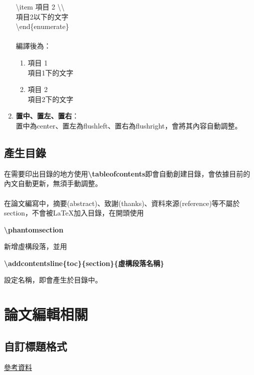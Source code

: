 \documentclass[12pt]{article}
\begin{document}
\begin{CJK*}{UTF8}{bsmi}
\begin{enumerate}[1.]
					\hspace*{5pc}\textbackslash item 項目 2 \textbackslash \textbackslash \\
					\hspace*{7pc} 項目2以下的文字 \\
					\hspace*{3pc}\textbackslash end\{enumerate\} \\ \\
					編譯後為：
					\begin{enumerate}[1.]
						\item 項目 1 \\
						項目1下的文字
						\item 項目 2 \\
						項目2下的文字
					\end{enumerate}
				\item \textbf{置中、置左、置右}： \\
					置中為center、置左為flushleft、置右為flushright，會將其內容自動調整。
			\end{enumerate}
		
		\newpage
		\subsection{產生目錄}
			\hspace*{2pc}在需要印出目錄的地方使用\textbf{\textbackslash tableofcontents}即會自動創建目錄，會依據目前的內文自動更新，無須手動調整。 \\ \\
			\hspace*{2pc}在論文編寫中，摘要(abstract)、致謝(thanks)、資料來源(reference)等不屬於section，不會被LaTeX加入目錄，在開頭使用
			\begin{center}
				\textbf{\textbackslash phantomsection}
			\end{center}
			新增虛構段落，並用
			\begin{center}
				\textbf{\textbackslash addcontentsline\{toc\}\{section\}\{虛構段落名稱\}} 
			\end{center}
			設定名稱，即會產生於目錄中。
		
		\newpage
		
		\section{論文編輯相關}
			\subsection{自訂標題格式}
				\href{https://zh.wikibooks.org/zh-tw/LaTeX/\%E7\%94\%9F\%E6\%88\%90\%E5\%B0\%81\%E9\%9D\%A2\%E5\%92\%8C\%E6\%A0\%87\%E9\%A2\%98}{參考資料}
			\newpage
			

\end{CJK*}
\end{document}
